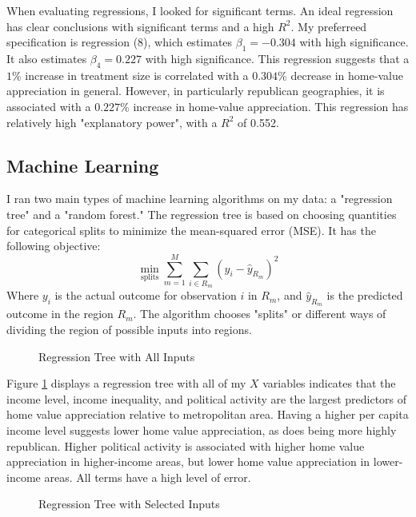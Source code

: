 \documentclass{article}
\begin{document}
When evaluating regressions, I looked for significant terms. An ideal regression has clear conclusions with significant terms and a high \(R^2\).
My preferreed specification is regression (8), which estimates $\beta_1=-0.304$ with high significance. It also estimates $\beta_4=0.227$ with high significance. This regression suggests that a $1\%$ increase in treatment size is correlated with a $0.304\%$ decrease in home-value appreciation in general. However, in particularly republican geographies, it is associated with a $0.227\%$ increase in home-value appreciation. This regression has relatively high "explanatory power", with a $R^2$ of 0.552.
\subsection{Machine Learning}
I ran two main types of machine learning algorithms on my data: a "regression tree" and a "random forest." The regression tree is based on choosing quantities for categorical splits to minimize the mean-squared error (MSE). It has the following objective:
$$\min_{\text{splits}}\sum_{m=1}^M\sum_{i\in R_m}(y_i-\hat y_{R_m})^2$$
Where $y_i$ is the actual outcome for observation $i$ in $R_m$, and $\hat y_{R_m}$ is the predicted outcome in the region $R_m$. The algorithm chooses "splits" or different ways of dividing the region of possible inputs into regions.
\setcounter{figure}{4}
\begin{figure}[htbp]
    \centering
    \caption{Regression Tree with All Inputs}
    \label{tree-all}
\end{figure}
    
    Figure \ref{tree-all} displays a regression tree with all of my \(X\) variables indicates that the income
level, income inequality, and political activity are the largest
predictors of home value appreciation relative to metropolitan area.
Having a higher per capita income level suggests lower home value
appreciation, as does being more highly republican. Higher political
activity is associated with higher home value appreciation in
higher-income areas, but lower home value appreciation in lower-income
areas. All terms have a high level of error.
\begin{figure}[htbp]
    \centering
    \caption{Regression Tree with Selected Inputs}
    \label{tree-some}
\end{figure}    
\end{document}
